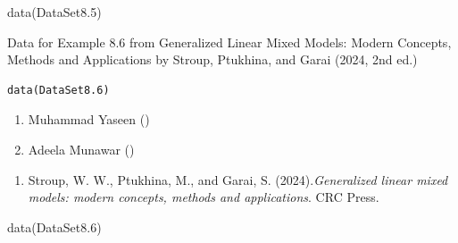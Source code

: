 \documentclass[a4paper]{book}
\begin{document}
\begin{Examples}
\begin{ExampleCode}
data(DataSet8.5)
\end{ExampleCode}
\end{Examples}
%
\begin{Description}
Data for Example 8.6 from Generalized Linear Mixed Models: Modern Concepts, Methods and Applications by Stroup, Ptukhina, and Garai (2024, 2nd ed.)
\end{Description}
%
\begin{Usage}
\begin{verbatim}
data(DataSet8.6)
\end{verbatim}
\end{Usage}
%
\begin{Author}
\begin{enumerate}

\item{}  Muhammad Yaseen ()
\item{} Adeela Munawar ()

\end{enumerate}

\end{Author}
%
\begin{References}
\begin{enumerate}

\item{} Stroup, W. W., Ptukhina, M., and Garai, S. (2024).\emph{Generalized linear mixed models: modern concepts, methods and applications}.
CRC Press.

\end{enumerate}

\end{References}
%
\begin{SeeAlso}
\end{SeeAlso}
%
\begin{Examples}
\begin{ExampleCode}
data(DataSet8.6)
\end{ExampleCode}
\end{Examples}
\end{document}
